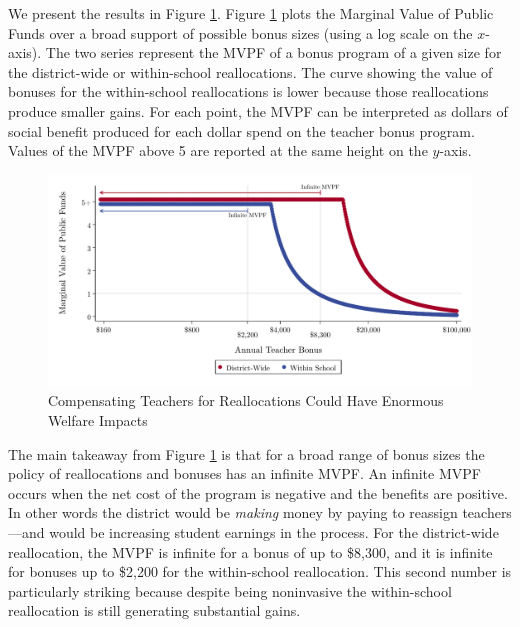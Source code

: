 \documentclass[12pt]{article}
\theoremstyle{definition}
\theoremstyle{definition}
\theoremstyle{definition}
\theoremstyle{definition}
\begin{document}
We present the results in Figure \ref{fig:mvpf}. Figure \ref{fig:mvpf} plots the Marginal Value of Public Funds over a broad support of possible bonus sizes (using a log scale on the $x$-axis). The two series represent the MVPF of a bonus program of a given size for the district-wide or within-school reallocations. The curve showing the value of bonuses for the within-school reallocations is lower because those reallocations produce smaller gains. For each point, the MVPF can be interpreted as dollars of social benefit produced for each dollar spend on the teacher bonus program. Values of the MVPF above 5 are reported at the same height on the $y$-axis. 


\begin{figure}[htpb]
\centering
\includegraphics[width=.9\textwidth]{Working_Paper/test_figures/05_MVPF.pdf}
    \caption{Compensating Teachers for Reallocations Could Have Enormous Welfare Impacts}
    \label{fig:mvpf}
\end{figure}



The main takeaway from Figure \ref{fig:mvpf} is that for a broad range of bonus sizes the policy of reallocations and bonuses has an infinite MVPF. An infinite MVPF occurs when the net cost of the program is negative and the benefits are positive. In other words the district would be \textit{making} money by paying to reassign teachers---and would be increasing student earnings in the process. For the district-wide reallocation, the MVPF is infinite for a bonus of up to \$8,300, and it is infinite for bonuses up to \$2,200 for the within-school reallocation. This second number is particularly striking because despite being noninvasive the within-school reallocation is still generating substantial gains. 
\end{document}
